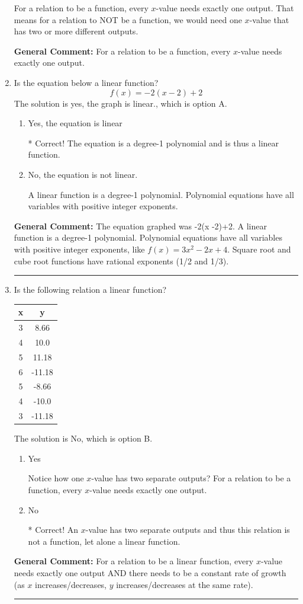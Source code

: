 \documentclass{extbook}[14pt]
\newcommand{\litem}[1]{\item #1

\rule{\textwidth}{0.4pt}}
\begin{document}
\begin{enumerate}
{\begin{enumerate}[label=\Alph*.]
For a relation to be a function, every $x$-value needs exactly one output. That means for a relation to NOT be a function, we would need one $x$-value that has two or more different outputs.
\end{enumerate}


\textbf{General Comment:} For a relation to be a function, every $x$-value needs exactly one output.
}
\litem{
Is the equation below a linear function?
\[ f(x) = -2(x -2)+2 \]The solution is yes, the graph is linear., which is option A.

\begin{enumerate}[label=\Alph*.]
\item Yes, the equation is linear

* Correct! The equation is a degree-1 polynomial and is thus a linear function.
\item No, the equation is not linear.

A linear function is a degree-1 polynomial. Polynomial equations have all variables with positive integer exponents.
\end{enumerate}


\textbf{General Comment:} The equation graphed was -2(x -2)+2. A linear function is a degree-1 polynomial. Polynomial equations have all variables with positive integer exponents, like $f(x) = 3x^2-2x+4$. Square root and cube root functions have rational exponents (1/2 and 1/3).
}
\litem{
Is the following relation a linear function?


\begin{tabular}{c|c}
x &y\tabularnewline \hline
3 &8.66\tabularnewline \hline
4 &10.0\tabularnewline \hline
5 &11.18\tabularnewline \hline
6 &-11.18\tabularnewline \hline
5 &-8.66\tabularnewline \hline
4 &-10.0\tabularnewline \hline
3 &-11.18\end{tabular}The solution is No, which is option B.

\begin{enumerate}[label=\Alph*.]
\item Yes

Notice how one $x$-value has two separate outputs? For a relation to be a function, every $x$-value needs exactly one output.
\item No

* Correct! An $x$-value has two separate outputs and thus this relation is not a function, let alone a linear function.
\end{enumerate}


\textbf{General Comment:} For a relation to be a linear function, every $x$-value needs exactly one output AND there needs to be a constant rate of growth (as $x$ increases/decreases, $y$ increases/decreases at the same rate).
}
\end{enumerate}
\end{document}
